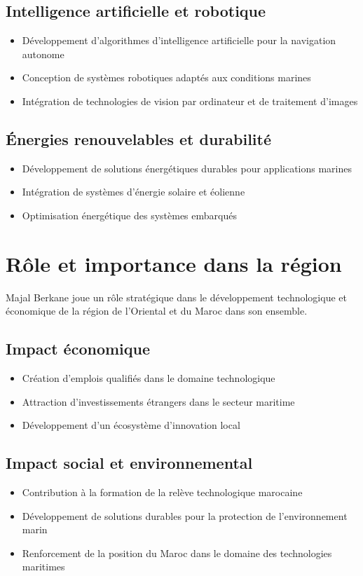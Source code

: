 {\subsection{Intelligence artificielle et robotique}
\begin{itemize}
    \item Développement d'algorithmes d'intelligence artificielle pour la navigation autonome
    \item Conception de systèmes robotiques adaptés aux conditions marines
    \item Intégration de technologies de vision par ordinateur et de traitement d'images
\end{itemize}

\subsection{Énergies renouvelables et durabilité}
\begin{itemize}
    \item Développement de solutions énergétiques durables pour applications marines
    \item Intégration de systèmes d'énergie solaire et éolienne
    \item Optimisation énergétique des systèmes embarqués
\end{itemize}

\section{Rôle et importance dans la région}
Majal Berkane joue un rôle stratégique dans le développement technologique et économique de la région de l'Oriental et du Maroc dans son ensemble.

\subsection{Impact économique}
\begin{itemize}
    \item Création d'emplois qualifiés dans le domaine technologique
    \item Attraction d'investissements étrangers dans le secteur maritime
    \item Développement d'un écosystème d'innovation local
\end{itemize}

\subsection{Impact social et environnemental}
\begin{itemize}
    \item Contribution à la formation de la relève technologique marocaine
    \item Développement de solutions durables pour la protection de l'environnement marin
    \item Renforcement de la position du Maroc dans le domaine des technologies maritimes
\end{itemize}

}
